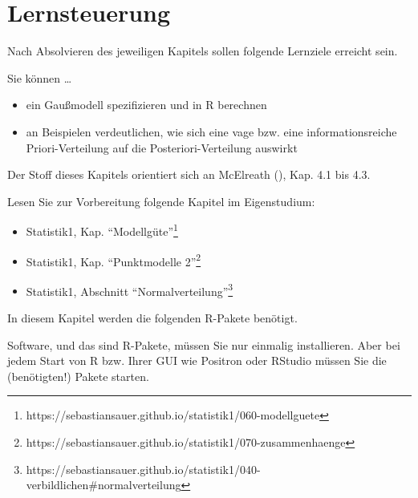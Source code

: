 \documentclass[
  ngerman,
  letterpaper,
  twoside,
  open=any]{scrbook}
\providecommand{\tightlist}{%
  \setlength{\itemsep}{0pt}\setlength{\parskip}{0pt}}\usepackage{longtable,booktabs,array}
\theoremstyle{definition}
\theoremstyle{plain}
\theoremstyle{definition}
\theoremstyle{definition}
\theoremstyle{definition}
\theoremstyle{definition}
\theoremstyle{remark}
\begin{document}
\section{Lernsteuerung}\label{lernsteuerung-7}

Nach Absolvieren des jeweiligen Kapitels sollen folgende Lernziele
erreicht sein.

Sie können \ldots{}

\begin{itemize}
\tightlist
\item
  ein Gaußmodell spezifizieren und in R berechnen
\item
  an Beispielen verdeutlichen, wie sich eine vage bzw. eine
  informationsreiche Priori-Verteilung auf die Posteriori-Verteilung
  auswirkt
\end{itemize}

Der Stoff dieses Kapitels orientiert sich an McElreath
(), Kap. 4.1 bis 4.3.

Lesen Sie zur Vorbereitung folgende Kapitel im Eigenstudium:

\begin{itemize}
\tightlist
\item
  Statistik1, Kap. \enquote{Modellgüte}\footnote{https://sebastiansauer.github.io/statistik1/060-modellguete}
\item
  Statistik1, Kap. \enquote{Punktmodelle 2}\footnote{https://sebastiansauer.github.io/statistik1/070-zusammenhaenge}
\item
  Statistik1, Abschnitt \enquote{Normalverteilung}\footnote{https://sebastiansauer.github.io/statistik1/040-verbildlichen\#normalverteilung}
\end{itemize}

In diesem Kapitel werden die folgenden R-Pakete benötigt.

\begin{tcolorbox}[enhanced jigsaw, arc=.35mm, bottomrule=.15mm, bottomtitle=1mm, breakable, colback=white, colbacktitle=quarto-callout-note-color!10!white, colframe=quarto-callout-note-color-frame, coltitle=black, left=2mm, leftrule=.75mm, opacityback=0, opacitybacktitle=0.6, rightrule=.15mm, title=\textcolor{quarto-callout-note-color}{\faInfo}\hspace{0.5em}{Hinweis}, titlerule=0mm, toprule=.15mm, toptitle=1mm]

Software, und das sind R-Pakete, müssen Sie nur einmalig installieren.
Aber bei jedem Start von R bzw. Ihrer GUI wie Positron oder RStudio
müssen Sie die (benötigten!) Pakete starten.

\end{tcolorbox}
\end{document}

